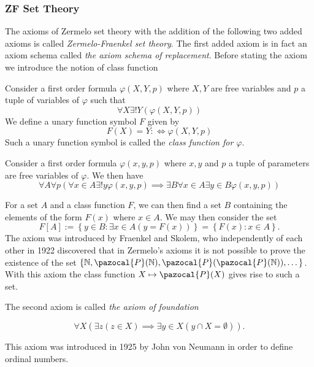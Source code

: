 \subsubsection{ZF Set Theory}
The axioms of Zermelo set theory with the addition of the following two added axioms is called \emph{Zermelo-Fraenkel set theory}. The first added axiom is in fact an axiom schema called \textit{the axiom schema of replacement}. Before stating the axiom we introduce the notion of class function
\begin{definition}
    Consider a first order formula $\varphi(X,Y,p)$ where $X,Y$ are free variables and $p$ a tuple of variables of $\varphi$ such that 
    $$\forall X\exists! Y(\varphi(X,Y,p))$$
    We define a unary function symbol $F$ given by 
    $$F(X)=Y :\iff \varphi(X,Y,p)$$
    Such a unary function symbol is called the \textit{class function for $\varphi$}.
\end{definition}
\begin{axioms}
   Consider a first order formula $\varphi(x,y,p)$ where $x,y$ and $p$ a tuple of parameters are free variables of $\varphi$. We then have 
      $$\forall A\forall p(\forall x\in A\exists! y\varphi(x,y,p)\implies \exists B\forall x\in A\exists y\in B\varphi(x,y,p))$$
\end{axioms} 
\begin{remark}
    For a set $A$ and a class function $F$, we can then find a set $B$ containing the elements of the form $F(x)$ where $x\in A$. We may then consider the set 
    $$F[A] := \left\{ y\in B: \exists x\in A(y=F(x))\right\}=\left\{F(x) : x\in A\right\}.$$
    The axiom was introduced by Fraenkel and Skolem, who independently of each other in 1922 discovered that in Zermelo's axioms it is not possible to prove the existence of the set $\{\N,\pazocal{P}(\N),\pazocal{P}(\pazocal{P}(\N)),\dots\}$. With this axiom the class function $X\mapsto \pazocal{P}(X)$ gives rise to such a set. 
\end{remark}
The second axiom is called \textit{the axiom of foundation}
\begin{axioms}
    $$\forall X\left(\exists z(z\in X)\implies \exists y\in X(y\cap X = \emptyset)\right).$$
\end{axioms}
This axiom was introduced in 1925 by John von Neumann in order to define ordinal numbers.
